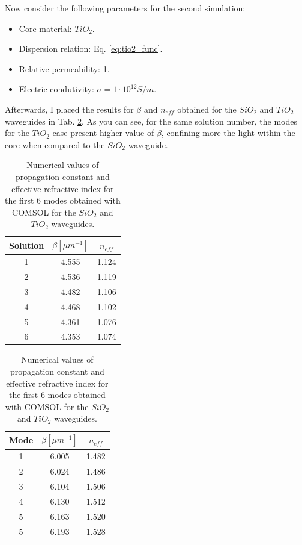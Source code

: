 \documentclass[a4paper,12pt]{article}
\begin{document}
Now consider the following parameters for the second simulation:
\begin{itemize}
    \item Core material: $TiO_2$.
    \item Dispersion relation: Eq. \eqref{eq:tio2_func}.
    \item Relative permeability: 1.
    \item Electric condutivity: $\sigma = 1 \cdot 10^{12}S/m$.
\end{itemize}

Afterwards, I placed the results for $\beta$ and $n_{eff}$ obtained for the $SiO_2$ and $TiO_2$ waveguides in Tab. \ref{tab:beta_num}. As you can see, for the same solution number, the modes for the $TiO_2$ case present higher value of $\beta$, confining more the light within the core when compared to the $SiO_2$ waveguide.  

\begin{table}[H]
    \centering
    \begin{subtable}{0.45\textwidth}
        \centering
        \begin{tabular}{ccc}
            \toprule
            Solution & $\beta [\mu m^{-1}]$ & $n_{eff}$ \\
            \midrule
            1 & 4.555 & 1.124 \\
            2 & 4.536 & 1.119 \\
            3 & 4.482 & 1.106 \\
            4 & 4.468 & 1.102 \\
            5 & 4.361 & 1.076 \\
            6 & 4.353 & 1.074 \\
            \bottomrule
        \end{tabular}
        \caption{$SiO_2$.}
    \end{subtable}
    \hfill
    \begin{subtable}{0.45\textwidth}
        \centering
        \begin{tabular}{ccc}
            \toprule
            Mode & $\beta [\mu m^{-1}]$ & $n_{eff}$ \\
            \midrule
            1 & 6.005 & 1.482 \\
            2 & 6.024 & 1.486 \\
            3 & 6.104 & 1.506 \\
            4 & 6.130 & 1.512 \\
            5 & 6.163 & 1.520 \\
            5 & 6.193 & 1.528 \\
            \bottomrule
        \end{tabular}
        \caption{$TiO_2$.}
    \end{subtable}
    \caption{Numerical values of propagation constant and effective refractive index for the first 6 modes obtained with COMSOL for the $SiO_2$ and $TiO_2$ waveguides.}
    \label{tab:beta_num}
\end{table}
\end{document}

